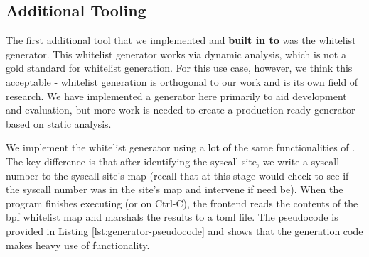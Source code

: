 \subsection{Additional Tooling}\label{subsubsec:additional-tooling}

The first additional tool that we implemented and \textbf{built in to \af} was
the whitelist generator. This whitelist generator works via dynamic analysis,
which is not a gold standard for whitelist generation. For this use case,
however, we think this acceptable - whitelist generation is orthogonal to our
work and is its own field of research. We have implemented a generator here
primarily to aid development and evaluation, but more work is needed to create a
production-ready generator based on static analysis.

We implement the whitelist generator using a lot of the same functionalities of
\af. The key difference is that after identifying the syscall site, we write a
syscall number to the syscall site's map (recall that at this stage \af would
check to see if the syscall number was in the site's map and intervene if need
be). When the program finishes executing (or on Ctrl-C), the frontend reads the
contents of the bpf whitelist map and marshals the results to a \ac{toml} file.
The pseudocode is provided in Listing \ref{lst:generator-pseudocode} and shows
that the generation code makes heavy use of \afg functionality.

